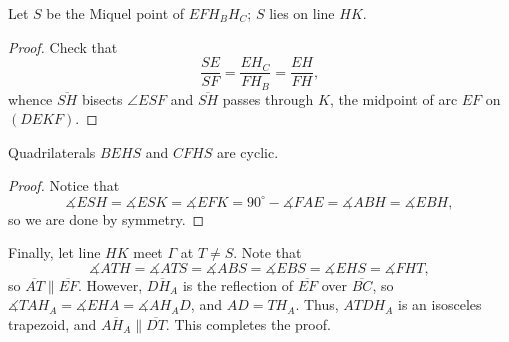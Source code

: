 \begin{claim}
    Let $S$ be the Miquel point of $EFH_BH_C$; $S$ lies on line $HK$.
\end{claim}
\begin{proof}
    Check that \[\frac{SE}{SF}=\frac{EH_C}{FH_B}=\frac{EH}{FH},\]
    whence $\overline{SH}$ bisects $\angle ESF$ and $\overline{SH}$ passes through $K$, the midpoint of arc $EF$ on $(DEKF)$.
\end{proof}
\begin{claim}
    Quadrilaterals $BEHS$ and $CFHS$ are cyclic.
\end{claim}
\begin{proof}
    Notice that \[\measuredangle ESH=\measuredangle ESK=\measuredangle EFK=90^\circ-\measuredangle FAE=\measuredangle ABH=\measuredangle EBH,\]
    so we are done by symmetry.
\end{proof}

Finally, let line $HK$ meet $\Gamma$ at $T\ne S$. Note that \[\measuredangle ATH=\measuredangle ATS=\measuredangle ABS=\measuredangle EBS=\measuredangle EHS=\measuredangle FHT,\]
so $\overline{AT}\parallel\overline{EF}$. However, $\overline{DH_A}$ is the reflection of $\overline{EF}$ over $\overline{BC}$, so $\measuredangle TAH_A=\measuredangle EHA=\measuredangle AH_AD$, and $AD=TH_A$. Thus, $ATDH_A$ is an isosceles trapezoid, and $\overline{AH_A}\parallel\overline{DT}$. This completes the proof. 

